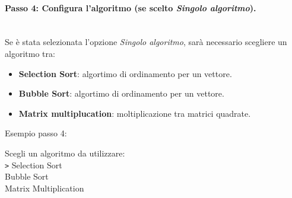 \documentclass{article}
\begin{document}
\paragraph{Passo 4: Configura l'algoritmo (se  scelto \textit{Singolo algoritmo}).}\leavevmode\\
Se è stata selezionata l'opzione \textit{Singolo algoritmo}, sarà necessario scegliere un algoritmo tra:
\begin{itemize}
    \item \textbf{Selection Sort}: algortimo di ordinamento per un vettore.
    \item \textbf{Bubble Sort}: algortimo di ordinamento per un vettore.
    \item \textbf{Matrix multiplucation}: moltiplicazione tra matrici quadrate.  
\end{itemize}
Esempio passo 4:
\begin{tcolorbox}[colback=black, coltext=white, sharp corners, boxrule=0.5mm, width=\textwidth]
    Scegli un algoritmo da utilizzare: \\
    \texttt{>} Selection Sort \\
    \hspace{2.5em}Bubble Sort \\
    \hspace{2.5em}Matrix Multiplication
\end{tcolorbox}
\end{document}
